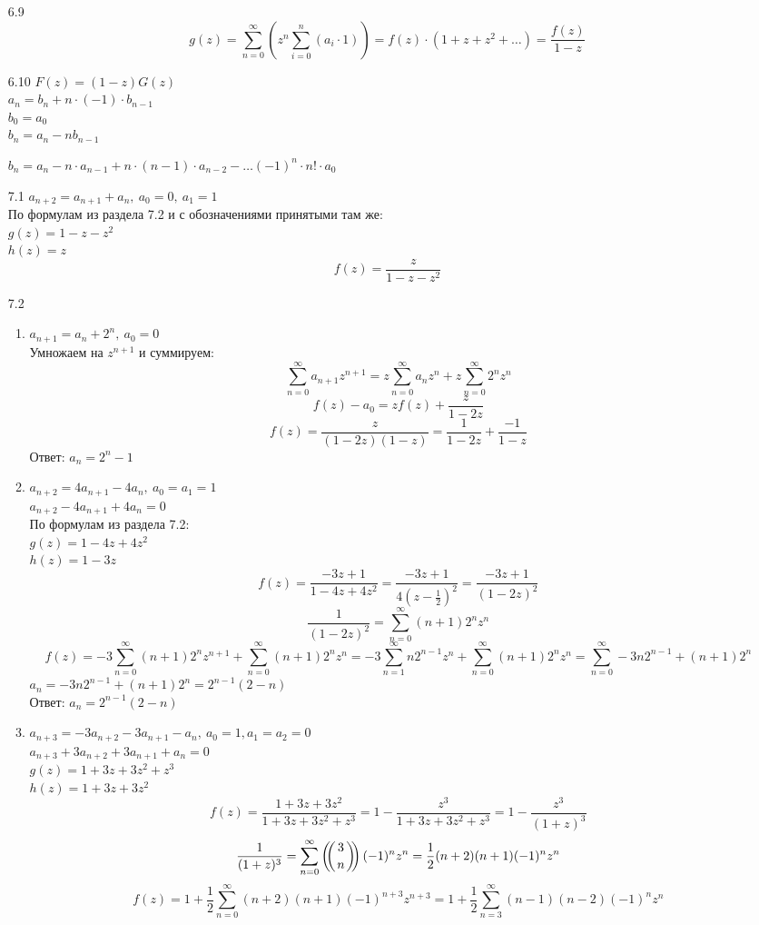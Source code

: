 \documentclass[10pt]{article}
\newcommand{\rchoose}[2]{\left(\mkern-6mu \left({#1 \atop #2}\right) \mkern-6mu \right)}
\begin{document}
\begin{enumerate}
	\item[6.9] $$g(z) = \sum_{n=0}^{\infty} \left( z^n \sum_{i=0}^n (a_i \cdot 1) \right) = f(z) \cdot (1 +z +z^2 + \ldots) = \frac{f(z)}{1-z}$$
	
	\item[6.10] $F(z) = (1-z)G(z)$\\
	$a_n= b_n + n \cdot (-1) \cdot b_{n-1}$\\
	$b_0 = a_0$\\
	$b_n = a_n - n b_{n-1}$
	
	$b_n = a_n - n \cdot a_{n-1} + n \cdot(n-1) \cdot a_{n-2} - \ldots (-1)^n\cdot n! \cdot a_0$
	
	\item[7.1] $a_{n+2} = a_{n+1} + a_n,\ a_0=0,\ a_1=1$\\
	По формулам из раздела 7.2 и с обозначениями принятыми там же:\\
	$g(z) = 1 - z - z^2$\\
	$h(z) = z$\\
	$$f(z) = \frac{z}{1-z-z^2}$$
	
	\item[7.2]
	\begin{enumerate}
		\item $a_{n+1} = a_n + 2^n,\ a_0=0$\\
		Умножаем на $z^{n+1}$ и суммируем:
		$$\sum_{n=0}^{\infty} a_{n+1} z^{n+1} = z \sum_{n=0}^{\infty} a_n z^n + z\sum_{n=0}^{\infty} 2^n z^n$$
		$$f(z) - a_0 = zf(z) + \frac{z}{1-2z}$$
		$$f(z) = \frac{z}{(1-2z)(1-z)} = \frac{1}{1-2z} + \frac{-1}{1-z}$$
		Ответ: $a_n = 2^n - 1$
		
		\item $a_{n+2} = 4a_{n+1} - 4a_n,\ a_0=a_1=1$\\
		$a_{n+2} - 4a_{n+1} + 4a_n = 0$\\
		По формулам из раздела 7.2:\\
		$g(z) = 1 - 4z + 4z^2$\\
		$h(z) = 1 -3z$\\
		$$f(z) = \frac{-3z+1}{1-4z + 4z^2} = \frac{-3z+1}{4(z-\frac{1}{2})^2} = \frac{-3z+1}{(1-2z)^2}$$
		$$\frac{1}{(1-2z)^2} = \sum_{n=0}^{\infty} (n+1)2^n z^n$$
		$$f(z) = -3\sum_{n=0}^{\infty}(n+1)2^n z^{n+1} + \sum_{n=0}^{\infty} (n+1)2^n z^n = -3\sum_{n=1}^{\infty}n 2^{n-1} z^n + \sum_{n=0}^{\infty} (n+1)2^n z^n = \sum_{n=0}^{\infty} -3 n 2^{n-1} + (n+1) 2^n$$
		$a_n = -3 n 2^{n-1} + (n+1) 2^n = 2^{n-1}(2-n)$\\
		Ответ: $a_n = 2^{n-1}(2-n)$
		
		\item $a_{n+3} = -3a_{n+2} -3a_{n+1} - a_n,\ a_0=1, a_1=a_2=0$\\
		$a_{n+3} + 3a_{n+2} + 3a_{n+1} + a_n = 0$\\
		$g(z) = 1 + 3z + 3z^2 + z^3$\\
		$h(z) = 1+3z + 3z^2$
		$$f(z) = \frac{1+3z + 3z^2}{1 + 3z + 3z^2 + z^3} = 1 - \frac{z^3}{1 + 3z + 3z^2 + z^3} = 1-\frac{z^3}{(1+z)^3}$$
		$$\frac{1}{(1+z)^3} = \sum_{n=0}^{\infty} \rchoose{3}{n} (-1)^n z^n = \frac{1}{2} (n+2) (n+1) (-1)^n z^n$$
		$$f(z) = 1 + \frac{1}{2} \sum_{n=0}^{\infty} (n+2)(n+1)(-1)^{n+3} z^{n+3} = 1 + \frac{1}{2} \sum_{n=3}^{\infty} (n-1)(n-2)(-1)^{n} z^{n}$$
		

\end{enumerate}
\end{enumerate}
\end{document}
